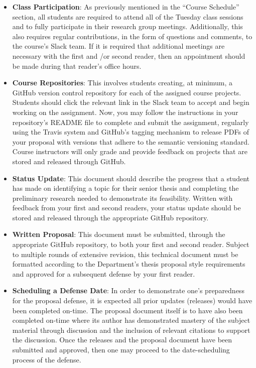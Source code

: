 \documentclass[11pt]{article}
\begin{document}
\begin{itemize}
  \itemsep -.25em

  \item {\bf Class Participation}: As previously mentioned in the ``Course Schedule'' section, all students are required to attend all of the Tuesday class sessions and to fully participate in their research group meetings. Additionally, this also requires regular contributions, in the form of questions and comments, to the course's Slack team. If it is required that additional meetings are necessary with the first and /or second reader, then  an appointment should be made during that reader's office hours.


  \item {\bf Course Repositories}: This involves students creating, at minimum, a GitHub version control repository for each of the assigned course projects. Students should click the relevant link in the Slack team to accept and begin working on the assignment. Now, you may follow the instructions in your repository's README file to complete and submit the assignment, regularly using the Travis system and GitHub's tagging mechanism to release PDFs of your proposal with versions that adhere to the semantic versioning standard. Course instructors will only grade and provide feedback on projects that are stored and released through GitHub.

  \item {\bf Status Update}: This document should describe the progress that a student has made on identifying a topic for their senior thesis and completing the preliminary research needed to demonstrate its feasibility. Written with feedback from your first and second readers, your status update should be stored and released through the appropriate GitHub repository.

  \item {\bf Written Proposal}: This document must be submitted, through the appropriate GitHub repository, to both your first and second reader. Subject to multiple rounds of extensive revision, this technical document must be formatted according to the Department's thesis proposal style requirements and approved for a subsequent defense by your first reader.

  \item {\bf Scheduling a Defense Date}:
   In order to demonstrate one's preparedness for the proposal defense, it is expected all prior updates (releases) would have been completed on-time. The proposal document itself is to have also been completed on-time where its author has demonstrated mastery of the subject material through discussion and the inclusion of relevant citations to support the discussion. Once the releases and the proposal document have been submitted and approved, then one may proceed to the date-scheduling process of the defense. 
  

\end{itemize}
\end{document}

